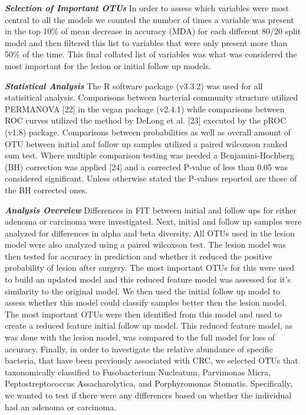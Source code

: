 \documentclass[12pt,]{article}
\begin{document}
\textbf{\emph{Selection of Important OTUs}} In order to assess which
variables were most central to all the models we counted the number of
times a variable was present in the top 10\% of mean decrease in
accuracy (MDA) for each different 80/20 split model and then filtered
this list to variables that were only present more than 50\% of the
time. This final collated list of variables was what was considered the
most important for the lesion or initial follow up models.

\textbf{\emph{Statistical Analysis}} The R software package (v3.3.2) was
used for all statisitical analysis. Comparisons between bacterial
community structure utilized PERMANOVA {[}22{]} in the vegan package
(v2.4.1) while comparisons between ROC curves utilized the method by
DeLong et al. {[}23{]} executed by the pROC (v1.8) package. Comparisons
between probabilities as well as overall amount of OTU between initial
and follow up samples utilized a paired wilcoxson ranked sum test. Where
multiple comparison testing was needed a Benjamini-Hochberg (BH)
correction was applied {[}24{]} and a corrected P-value of less than
0.05 was considered significant. Unless otherwise stated the P-values
reported are those of the BH corrected ones.

\textbf{\emph{Analysis Overview}} Differences in FIT between initial and
follow ups for either adenoma or carcinoma were investigated. Next,
initial and follow up samples were analyzed for differences in alpha and
beta diversity. All OTUs used in the lesion model were also analyzed
using a paired wilcoxson test. The lesion model was then tested for
accuracy in prediction and whether it reduced the positive probability
of lesion after surgery. The most important OTUs for this were used to
build an updated model and this reduced feature model was assessed for
it's similarity to the original model. We then used the initial follow
up model to assess whether this model could classify samples better then
the lesion model. The most important OTUs were then identified from this
model and used to create a reduced feature initial follow up model. This
reduced feature model, as was done with the lesion model, was compared
to the full model for loss of accuracy. Finally, in order to investigate
the relative abundance of specific bacteria, that have been previously
associated with CRC, we selected OTUs that taxonomically classified to
Fusobacterium Nucleatum, Parvimonas Micra, Peptostreptococcus
Assacharolytica, and Porphyromonas Stomatis. Specifically, we wanted to
test if there were any differences based on whether the individual had
an adenoma or carcinoma.
\end{document}
